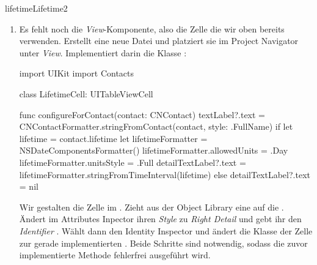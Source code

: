 \documentclass[parskip=half, final]{scrreprt}
\begin{document}
\begin{lecture}
\begin{exc}
\begin{excitem}{lifetime}{Lifetime}{2}
\begin{enumerate}
\begin{swiftcode}
{    override func tableView(tableView: UITableView, cellForRowAtIndexPath indexPath: NSIndexPath) -> UITableViewCell {
        // VIEW-Komponente: Frage die Table View nach einer wiederverwendbaren Zelle
        let cell = tableView.dequeueReusableCellWithIdentifier("LifetimeCell", forIndexPath: indexPath) as! LifetimeCell
        // MODEL-Komponente: Bestimme den Kontakt für diese Zeile
        let contact = contacts[indexPath.row]
        // CONTROLLER-Komponente: Konfiguriere die Zelle nach dem Kontakt
        cell.configureForContact(contact)
        if contact.lifetime != nil {
            cell.selectionStyle = .Default
            cell.accessoryType = .DisclosureIndicator
        } else {
            cell.selectionStyle = .None
            cell.accessoryType = .None
        }
        return cell
    }

}
\end{swiftcode}

\item Es fehlt noch die \mvcindicatorview\emph{View}-Komponente, also die Zelle die wir oben bereits verwenden. Erstellt eine neue Datei  und platziert sie im Project Navigator unter \emph{View}. Implementiert darin die Klasse :

\begin{swiftcode}
import UIKit
import Contacts

class LifetimeCell: UITableViewCell {
    
    func configureForContact(contact: CNContact) {
        textLabel?.text = CNContactFormatter.stringFromContact(contact, style: .FullName)
        if let lifetime = contact.lifetime {
            let lifetimeFormatter = NSDateComponentsFormatter()
            lifetimeFormatter.allowedUnits = .Day
            lifetimeFormatter.unitsStyle = .Full
            detailTextLabel?.text = lifetimeFormatter.stringFromTimeInterval(lifetime)
        } else {
            detailTextLabel?.text = nil
        }
    }
    
}
\end{swiftcode}

Wir gestalten die Zelle im . Zieht aus der Object Library eine  auf die . Ändert im Attributes Inpector ihren \emph{Style} zu \emph{Right Detail} und gebt ihr den \emph{Identifier} . Wählt dann den Identity Inspector und ändert die Klasse der Zelle zur gerade implementierten . Beide Schritte sind notwendig, sodass die zuvor implementierte  Methode fehlerfrei ausgeführt wird.


\end{enumerate}
\end{excitem}
\end{exc}
\end{lecture}
\end{document}
